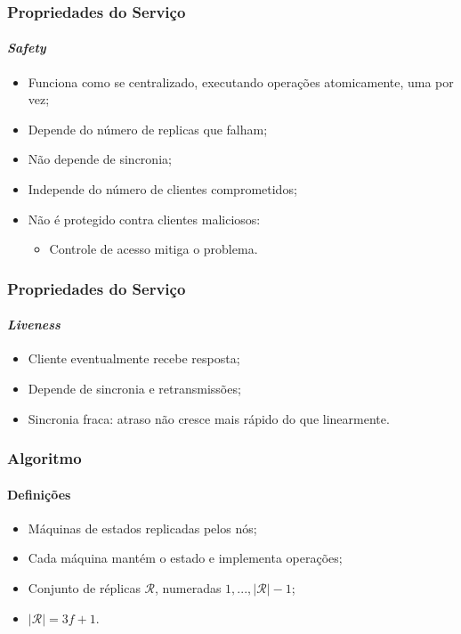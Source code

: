 \documentclass{beamer}
\begin{document}
\begin{frame}
  \frametitle{Propriedades do Serviço}
  \framesubtitle{\textit{Safety}}

  \begin{itemize}
    \item
      Funciona como se centralizado, executando operações atomicamente, uma por vez;

    \item
      Depende do número de replicas que falham;

    \item
      Não depende de sincronia;

    \item
      Independe do número de clientes comprometidos;

    \item
      Não é protegido contra clientes maliciosos:
      \begin{itemize}
        \item
          Controle de acesso mitiga o problema.
      \end{itemize}
  \end{itemize}
\end{frame}

\begin{frame}
  \frametitle{Propriedades do Serviço}
  \framesubtitle{\textit{Liveness}}

  \begin{itemize}
    \item
      Cliente eventualmente recebe resposta;

    \item
      Depende de sincronia e retransmissões;
      
    \item
      Sincronia fraca: atraso não cresce mais rápido do que linearmente.
  \end{itemize}
\end{frame}

\begin{frame}
  \frametitle{Algoritmo}
  \framesubtitle{Definições}

  \begin{itemize}
    \item
      Máquinas de estados replicadas pelos nós;

    \item
      Cada máquina mantém o estado e implementa operações;

    \item
      Conjunto de réplicas $\mathcal{R}$, numeradas $1, ..., |\mathcal{R}| - 1$;

    \item
      $|\mathcal{R}| = 3f + 1$.
  \end{itemize}
\end{frame}
\end{document}
